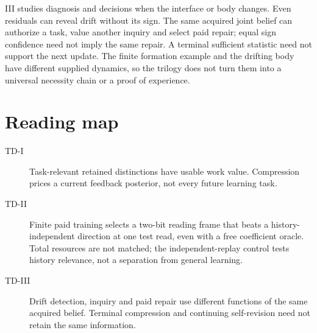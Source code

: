\documentclass[11pt,a4paper]{article}
\begin{document}
III studies diagnosis and decisions when the interface or body changes. Even residuals can reveal drift without its sign. The same acquired joint belief can authorize a task, value another inquiry and select paid repair; equal sign confidence need not imply the same repair. A terminal sufficient statistic need not support the next update. The finite formation example and the drifting body have different supplied dynamics, so the trilogy does not turn them into a universal necessity chain or a proof of experience.

\section*{Reading map}
\begin{description}
\item[TD-I] Task-relevant retained distinctions have usable work value. Compression prices a current feedback posterior, not every future learning task.
\item[TD-II] Finite paid training selects a two-bit reading frame that beats a history-independent direction at one test read, even with a free coefficient oracle. Total resources are not matched; the independent-replay control tests history relevance, not a separation from general learning.
\item[TD-III] Drift detection, inquiry and paid repair use different functions of the same acquired belief. Terminal compression and continuing self-revision need not retain the same information.
\end{description}
\end{document}
